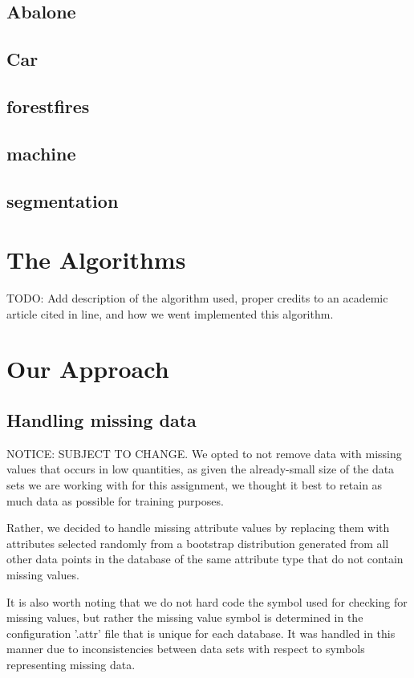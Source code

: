 \documentclass[twoside,11pt]{article}
\begin{document}
\subsection{Abalone}

\subsection{Car}

\subsection{forestfires}

\subsection{machine}

\subsection{segmentation}

\section{The Algorithms}
TODO: Add description of the algorithm used, proper credits to an academic article cited in line, and how we went implemented this algorithm.



\section{Our Approach}
\subsection{Handling missing data} NOTICE: SUBJECT TO CHANGE.
 We opted to not remove data with missing values that occurs in low quantities, as given the already-small size of the data sets we are working with for this assignment, we thought it best to retain as much data as possible for training purposes. 

Rather, we decided to handle missing attribute values by replacing them with attributes selected randomly from a bootstrap distribution generated from all other data points in the database of the same attribute type that do not contain missing values. 

It is also worth noting that we do not hard code the symbol used for checking for missing values, but rather the missing value symbol is determined in the configuration '.attr' file that is unique for each database. It was handled in this manner due to inconsistencies between data sets with respect to symbols representing missing data.
\end{document}
